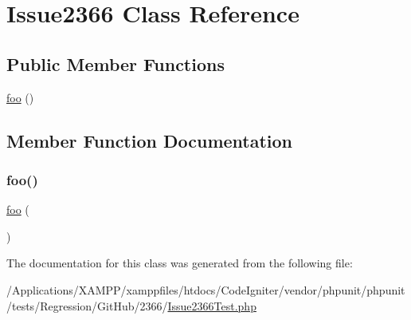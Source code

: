 \hypertarget{class_issue2366}{}\section{Issue2366 Class Reference}
\label{class_issue2366}
\subsection*{Public Member Functions}
\begin{DoxyCompactItemize}
\item 
\mbox{\hyperlink{class_issue2366_a79418a120498dd9cf915655654607747}{foo}} ()
\end{DoxyCompactItemize}


\subsection{Member Function Documentation}
\mbox{\label{class_issue2366_a79418a120498dd9cf915655654607747}} 
\subsubsection{\texorpdfstring{foo()}{foo()}}
{\footnotesize\ttfamily \mbox{\hyperlink{interfacefoo}{foo}} (\begin{DoxyParamCaption}{ }\end{DoxyParamCaption})}



The documentation for this class was generated from the following file\+:\begin{DoxyCompactItemize}
\item 
/\+Applications/\+X\+A\+M\+P\+P/xamppfiles/htdocs/\+Code\+Igniter/vendor/phpunit/phpunit/tests/\+Regression/\+Git\+Hub/2366/\mbox{\hyperlink{_issue2366_test_8php}{Issue2366\+Test.\+php}}\end{DoxyCompactItemize}
